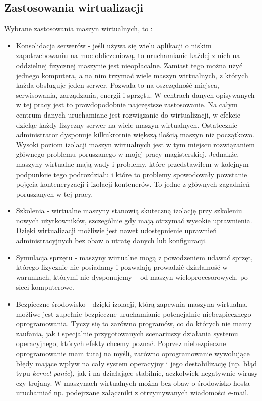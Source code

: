 \documentclass[10pt,a4paper,titlepage,twoside]{report}
\begin{document}
\subsection{Zastosowania wirtualizacji}\indent \indent Wybrane zastosowania maszyn wirtualnych, to \cite{ad15}:
\begin{itemize}
	\item Konsolidacja serwerów - jeśli używa się wielu aplikacji o niskim zapotrzebowaniu na moc obliczeniową, to uruchamianie każdej z nich na oddzielnej fizycznej maszynie jest nieopłacalne. Zamiast tego można użyć jednego komputera, a na nim trzymać wiele maszyn wirtualnych, z których każda obsługuje jeden serwer. Pozwala to na oszczędność miejsca, serwisowania, zarządzania, energii i sprzętu. W centrach danych opisywanych w tej pracy jest to prawdopodobnie najczęstsze zastosowanie. Na całym centrum danych uruchamiane jest rozwiązanie do wirtualizacji, w efekcie dzieląc każdy fizyczny serwer na wiele maszyn wirtualnych. Ostatecznie administrator dysponuje kilkukrotnie większą ilością maszyn niż początkowo. Wysoki poziom izolacji maszyn wirtualnych jest w tym miejscu rozwiązaniem głównego problemu poruszanego w mojej pracy magisterskiej. Jednakże, maszyny wirtualne mają wady i problemy, które przedstawiłem w kolejnym podpunkcie tego podrozdziału i które to problemy spowodowały powstanie pojęcia konteneryzacji i izolacji kontenerów. To jedne z głównych zagadnień poruszanych w tej pracy.
	\item Szkolenia - wirtualne maszyny stanowią skuteczną izolację przy szkoleniu nowych użytkowników, szczególnie gdy mają otrzymać wysokie uprawnienia. Dzięki wirtualizacji możliwie jest nawet udostępnienie uprawnień administracyjnych bez obaw o utratę danych lub konfiguracji.
	\item Symulacja sprzętu - maszyny wirtualne mogą z powodzeniem udawać sprzęt, którego fizycznie nie posiadamy i pozwalają prowadzić działalność w warunkach, którymi nie dysponujemy – od maszyn wieloprocesorowych, po sieci komputerowe.
	\item Bezpieczne środowisko - dzięki izolacji, którą zapewnia maszyna wirtualna, możliwe jest zupełnie bezpieczne uruchamianie potencjalnie niebezpiecznego oprogramowania. Tyczy się to zarówno programów, co do których nie mamy zaufania, jak i specjalnie przygotowanych scenariuszy działania systemu operacyjnego, których efekty chcemy poznać. Poprzez niebezpieczne oprogramowanie mam tutaj na myśli, zarówno oprogramowanie wywołujące błędy mające wpływ na cały system operacyjny i jego destabilizację (np. błąd typu \textit{kernel panic}), jak i na działające stabilnie, aczkolwiek negatywnie wirusy czy trojany. W maszynach wirtualnych można bez obaw o środowisko hosta uruchamiać np. podejrzane załączniki z otrzymywanych wiadomości e-mail.

\end{itemize}
\end{document}
